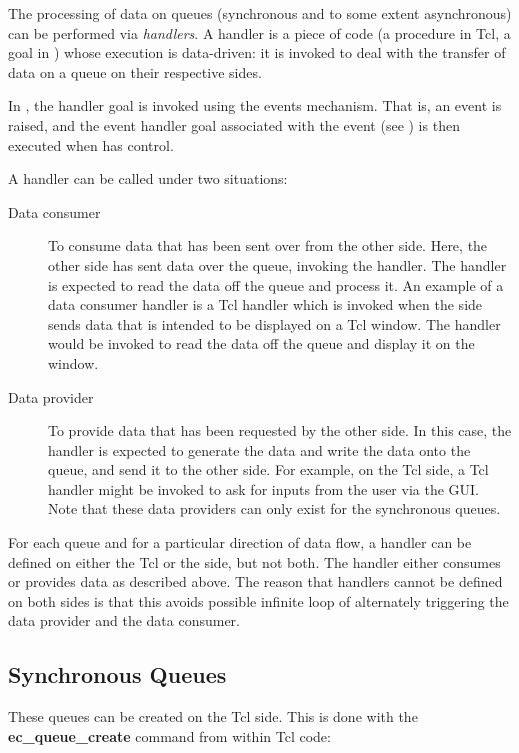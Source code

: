 The processing of data on queues (synchronous and to some extent
asynchronous) can be performed via {\it handlers}. A handler is a piece of
code (a procedure in Tcl, a goal in {\eclipse}) whose execution is
data-driven: it is invoked to deal
with the transfer of data on a queue on their respective sides. 

In {\eclipse}, the handler goal is invoked using the events mechanism. That
 is, an event is raised, and the event handler goal associated with the event
 (see ) is then executed when {\eclipse} has control. 

A handler can be called under two situations:

\begin{description}
\item[Data consumer] To consume data that has been sent over from the other
side. Here, the other side has sent data over the queue, invoking the handler.
The handler is expected to read the data off the queue and process it.
An example of a data consumer handler is a Tcl handler which is invoked
when the {\eclipse} side sends data that is intended to be displayed on a Tcl
window. The handler would be
invoked to read the data off the queue and display it on the window. 

\item[Data provider] To provide data that has been requested by the other side. In this
 case, the handler is expected to generate the data and write the data onto
 the queue, and send it to the other side.  For example, on the Tcl side, a
 Tcl handler might be invoked to ask for inputs from the user via the GUI.
 Note that these data providers can only exist for the synchronous
 queues.

\end{description}

For each queue and for a particular direction of data flow, a
handler can be defined on either the Tcl or the {\eclipse} side, but not
both. The handler either consumes or provides data as described above. The
reason that handlers cannot be defined on both sides 
is that this avoids possible infinite loop of alternately
triggering the data provider and the data consumer.

\subsection{Synchronous Queues}


These queues can be created on the Tcl side. This is done with
the {\bf ec_queue_create} command from within Tcl code:

